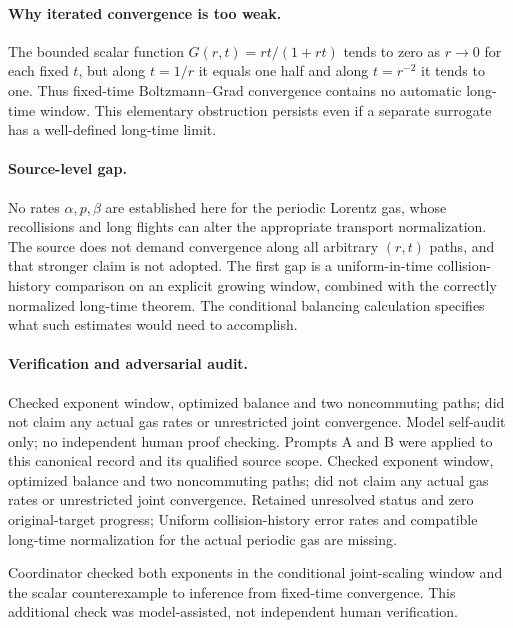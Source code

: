 \documentclass[11pt]{article}
\begin{document}
\paragraph{Why iterated convergence is too weak.} The bounded scalar function $G(r,t)=rt/(1+rt)$ tends to zero as $r\to0$ for each fixed $t$, but along $t=1/r$ it equals one half and along $t=r^{-2}$ it tends to one. Thus fixed-time Boltzmann--Grad convergence contains no automatic long-time window. This elementary obstruction persists even if a separate surrogate has a well-defined long-time limit.

\paragraph{Source-level gap.} No rates $\alpha,p,\beta$ are established here for the periodic Lorentz gas, whose recollisions and long flights can alter the appropriate transport normalization. The source does not demand convergence along all arbitrary $(r,t)$ paths, and that stronger claim is not adopted. The first gap is a uniform-in-time collision-history comparison on an explicit growing window, combined with the correctly normalized long-time theorem. The conditional balancing calculation specifies what such estimates would need to accomplish.

\paragraph{Verification and adversarial audit.}
Checked exponent window, optimized balance and two noncommuting paths; did not claim any actual gas rates or unrestricted joint convergence. Model self-audit only; no independent human proof checking. Prompts A and B were applied to this canonical record and its qualified source scope. Checked exponent window, optimized balance and two noncommuting paths; did not claim any actual gas rates or unrestricted joint convergence. Retained unresolved status and zero original-target progress; Uniform collision-history error rates and compatible long-time normalization for the actual periodic gas are missing.

Coordinator checked both exponents in the conditional joint-scaling window and the scalar counterexample to inference from fixed-time convergence. This additional check was model-assisted, not independent human verification.
\end{document}
